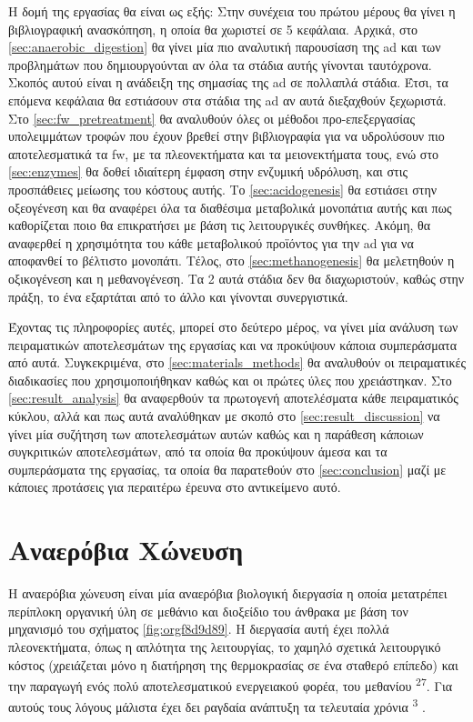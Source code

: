\documentclass[11pt]{report}
\makeatletter
\newcommand{\citeprocitem}[2]{\hyper@linkstart{cite}{citeproc_bib_item_#1}#2\hyper@linkend}
\makeatother
\begin{document}
Η δομή της εργασίας θα είναι ως εξής: Στην συνέχεια του πρώτου μέρους θα γίνει η βιβλιογραφική ανασκόπηση, η οποία θα χωριστεί σε 5 κεφάλαια. Αρχικά, στο \autoref{sec:anaerobic_digestion} θα γίνει μία πιο αναλυτική παρουσίαση της \acrshort{ad} και των προβλημάτων που δημιουργούνται αν όλα τα στάδια αυτής γίνονται ταυτόχρονα. Σκοπός αυτού είναι η ανάδειξη της σημασίας της \acrshort{ad} σε πολλαπλά στάδια. Έτσι, τα επόμενα κεφάλαια θα εστιάσουν στα στάδια της \acrshort{ad} αν αυτά διεξαχθούν ξεχωριστά. Στο \autoref{sec:fw_pretreatment} θα αναλυθούν όλες οι μέθοδοι προ-επεξεργασίας υπολειμμάτων τροφών που έχουν βρεθεί στην βιβλιογραφία για να υδρολύσουν πιο αποτελεσματικά τα \acrshort{fw}, με τα πλεονεκτήματα και τα μειονεκτήματα τους, ενώ στο \autoref{sec:enzymes} θα δοθεί ιδιαίτερη έμφαση στην ενζυμική υδρόλυση, και στις προσπάθειες μείωσης του κόστους αυτής. Το \autoref{sec:acidogenesis} θα εστιάσει στην οξεογένεση και θα αναφέρει όλα τα διαθέσιμα μεταβολικά μονοπάτια αυτής και πως καθορίζεται ποιο θα επικρατήσει με βάση τις λειτουργικές συνθήκες. Ακόμη, θα αναφερθεί η χρησιμότητα του κάθε μεταβολικού προϊόντος για την \acrshort{ad} για να αποφανθεί το βέλτιστο μονοπάτι. Τέλος, στο \autoref{sec:methanogenesis} θα μελετηθούν η οξικογένεση και η μεθανογένεση. Τα 2 αυτά στάδια δεν θα διαχωριστούν, καθώς στην πράξη, το ένα εξαρτάται από το άλλο και γίνονται συνεργιστικά.

Έχοντας τις πληροφορίες αυτές, μπορεί στο δεύτερο μέρος, να γίνει μία ανάλυση των πειραματικών αποτελεσμάτων της εργασίας και να προκύψουν κάποια συμπεράσματα από αυτά. Συγκεκριμένα, στο \autoref{sec:materials_methods} θα αναλυθούν οι πειραματικές διαδικασίες που χρησιμοποιήθηκαν καθώς και οι πρώτες ύλες που χρειάστηκαν. Στο \autoref{sec:result_analysis} θα αναφερθούν τα πρωτογενή αποτελέσματα κάθε πειραματικός κύκλου, αλλά και πως αυτά αναλύθηκαν με σκοπό στο \autoref{sec:result_discussion} να γίνει μία συζήτηση των αποτελεσμάτων αυτών καθώς και η παράθεση κάποιων συγκριτικών αποτελεσμάτων, από τα οποία θα προκύψουν άμεσα και τα συμπεράσματα της εργασίας, τα οποία θα παρατεθούν στο \autoref{sec:conclusion} μαζί με κάποιες προτάσεις για περαιτέρω έρευνα στο αντικείμενο αυτό.

\chapter{Αναερόβια Χώνευση}
\label{sec:orgb12759a}
\label{sec:anaerobic_digestion}

Η αναερόβια χώνευση είναι μία αναερόβια βιολογική διεργασία η οποία μετατρέπει περίπλοκη οργανική ύλη σε μεθάνιο και διοξείδιο του άνθρακα με βάση τον μηχανισμό του σχήματος \ref{fig:orgf8d9d89}. Η διεργασία αυτή έχει πολλά πλεονεκτήματα, όπως η απλότητα της λειτουργίας, το χαμηλό σχετικά λειτουργικό κόστος (χρειάζεται μόνο η διατήρηση της θερμοκρασίας σε ένα σταθερό επίπεδο) και την παραγωγή ενός πολύ αποτελεσματικού ενεργειακού φορέα, του μεθανίου \textsuperscript{\citeprocitem{27}{27}}. Για αυτούς τους λόγους μάλιστα έχει δει ραγδαία ανάπτυξη τα τελευταία χρόνια \textsuperscript{\citeprocitem{3}{3}} .
\end{document}
